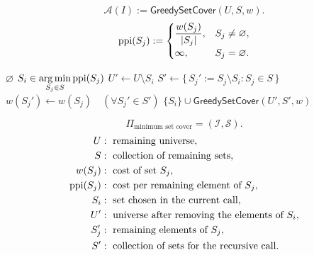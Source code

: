 \documentclass[12pt,a4paper]{article}
\begin{document}
\noindent\begin{minipage}{\linewidth}
\begin{definition}
\[
\mathcal A(I):=\mathsf{GreedySetCover}(U,S,w).
\]
\[
\operatorname{ppi}(S_j):=\begin{cases}
\dfrac{w(S_j)}{|S_j|},&S_j\neq\varnothing,\\[3pt]
\infty,&S_j=\varnothing.
\end{cases}
\]
\begin{algorithm}[H]
\caption{$\mathsf{GreedySetCover}(U,S,w)$}
\begin{algorithmic}[1]
    \State \Return $\varnothing$
\Else
    \State $S_i\in\displaystyle\operatorname*{arg\,min}_{S_j\in S}\operatorname{ppi}(S_j)$
    \State $U'\gets U\setminus S_i$
    \State $S'\gets\{\,S_j':=S_j\setminus S_i:S_j\in S\,\}$
    \State $w(S_j')\gets w(S_j)\quad(\forall S_j'\in S')$
    \State \Return $\{S_i\}\cup\mathsf{GreedySetCover}(U',S',w)$
\EndIf
\end{algorithmic}
\end{algorithm}
\[
\Pi_{\text{minimum set cover}}=(\mathcal I,\mathcal S).
\]
\[
\begin{aligned}
U&:\text{ remaining universe},\\
S&:\text{ collection of remaining sets},\\
w(S_j)&:\text{ cost of set }S_j,\\
\operatorname{ppi}(S_j)&:\text{ cost per remaining element of }S_j,\\
S_i&:\text{ set chosen in the current call},\\
U'&:\text{ universe after removing the elements of }S_i,\\
S_j'&:\text{ remaining elements of }S_j,\\
S'&:\text{ collection of sets for the recursive call}.
\end{aligned}
\]
\end{definition}
\end{minipage}\par
\end{document}
